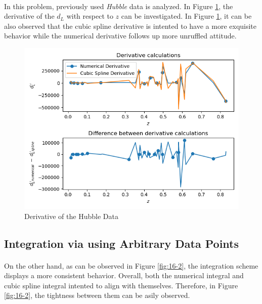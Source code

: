 \documentclass[letterpaper,12pt]{article}
\begin{document}
\paragraph{} In this problem, previously used \textit{Hubble} data is analyzed. In Figure \ref{fig:16-1}, the derivative of the $d_L$ with respect to $z$ can be investigated. In Figure \ref{fig:16-1}, it can be also observed that the cubic spline derivative is intented to have a more exquisite behavior while the numerical derivative follows up more unruffled attitude.
\begin{figure}[H]
\centerline{\includegraphics[width=\linewidth]{figures/16-1.png}}
\caption{Derivative of the Hubble Data }
\label{fig:16-1}
\end{figure}
\subsection{Integration via using Arbitrary Data Points}

\paragraph{} On the other hand, as can be observed in Figure \ref{fig:16-2}, the integration scheme displays a more consistent behavior. Overall, both the numerical integral and cubic spline integral intented to align with themselves. Therefore, in Figure \ref{fig:16-2}, the tightness between them can be asily observed.
\end{document}
